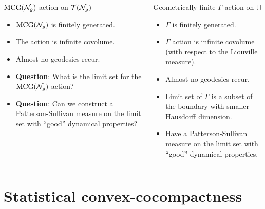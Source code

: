 \begin{frame}
 \begin{columns}
\begin{column}{0.5\textwidth}
  \begin{center}
    $\text{MCG}(\mathcal{N}_g)$-action on $\mathcal{T}(\mathcal{N}_g)$ \\
  \end{center}
  \begin{itemize}
  \item<2-> $\text{MCG}(\mathcal{N}_g)$ is finitely generated.
  \item<3-> The action is infinite covolume.
  \item<4-> Almost no geodesics recur.
  \item<10-> \textbf{Question}: What is the limit set for the $\text{MCG}(\mathcal{N}_g)$ action?
  \item<12-> \textbf{Question}: Can we construct a Patterson-Sullivan measure on the limit set with ``good'' dynamical properties?
  \end{itemize}
\end{column}
 {
\begin{column}{0.5\textwidth}  %
    \begin{center}
      Geometrically finite $\Gamma$ action on $\mathbb{H}$
     \end{center}
     \begin{itemize}
     \item<6-> $\Gamma$ is finitely generated.
     \item<7-> $\Gamma$ action is infinite covolume (with respect to the Liouville measure).
     \item<8-> Almost no geodesics recur.
     \item<9-> Limit set of $\Gamma$ is a subset of the boundary with smaller Hausdorff dimension.
     \item<11-> Have a Patterson-Sullivan measure on the limit set with ``good'' dynamical properties.
     \end{itemize}
\end{column}
}

\end{columns}
\end{frame}

\section{Statistical convex-cocompactness}

